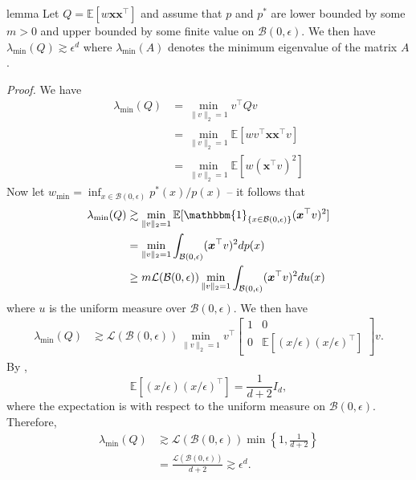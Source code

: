 \documentclass[11pt]{article}
\begin{document}
\begin{appendices}
\begin{restatable}{lemma}{}
    Let $Q = \mathbb{E}\left[w\boldsymbol{x}\boldsymbol{x}^{\top}\right]$
    and assume that $p$ and $p^*$ are lower bounded by some $m > 0$ and upper bounded by some finite value on $\mathcal{B}(0, \epsilon)$. We then have
    $\lambda_{\min}(Q) \gtrsim \epsilon^d$ where $\lambda_{\min}(A)$ denotes the minimum eigenvalue of the matrix $A$. 
    \label{lemma: Q op norm}
\end{restatable}
\noindent \textit{Proof.} We have
\begin{align*}
    \lambda_{\min}(Q) &= \min_{\|v\|_2 = 1}v^{\top}Qv \\
    &= \min_{\|v\|_2 = 1} \mathbb{E}[wv^{\top}\boldsymbol{x}\boldsymbol{x}^{\top}v] \\
    &= \min_{\|v\|_2 = 1} \mathbb{E}[w(\boldsymbol{x}^{\top}v)^2]
\end{align*}
Now let $w_{\min} = \inf_{x \in \mathcal{B}(0, \epsilon)}p^*(x)/p(x)$ -- it follows that
\begin{align*}
    \lambda_{\min}(Q) &\gtrsim \min_{\|v\|_2 = 1}\mathbb{E}[\mathbbm{1}_{\{x \in \mathcal{B}(0, \epsilon)\}}(\boldsymbol{x}^{\top}v)^2] \\
    &= \min_{\|v\|_2 = 1}\int_{\mathcal{B}(0, \epsilon)}(\boldsymbol{x}^{\top}v)^2 dp(x) \\
    &\geq m \mathcal{L}(\mathcal{B}(0, \epsilon))\min_{\|v\|_2 = 1}\int_{\mathcal{B}(0, \epsilon)}(\boldsymbol{x}^{\top}v)^2 du(x)
\end{align*}
where $u$ is the uniform measure over $\mathcal{B}(0, \epsilon)$. We then have
\begin{align*}
    \lambda_{\min}(Q)
    &\gtrsim \mathcal{L}(\mathcal{B}(0,\epsilon))
    \min_{\|v\|_2=1}
    v^\top
    \begin{bmatrix}
        1 & 0 \\
        0 & \mathbb{E}[(x/\epsilon)(x/\epsilon)^\top]
    \end{bmatrix}
    v.
\end{align*}
By ,
\[
    \mathbb{E}[(x/\epsilon)(x/\epsilon)^\top]
    =
    \frac{1}{d+2}I_d,
\]
where the expectation is with respect to the uniform measure on $\mathcal{B}(0,\epsilon)$. Therefore,
\begin{align*}
    \lambda_{\min}(Q)
    &\gtrsim
    \mathcal{L}(\mathcal{B}(0,\epsilon))
    \min\left\{1,\frac{1}{d+2}\right\} \\
    &=
    \frac{\mathcal{L}(\mathcal{B}(0,\epsilon))}{d+2}
    \gtrsim \epsilon^d.
\end{align*}


\end{appendices}
\end{document}
